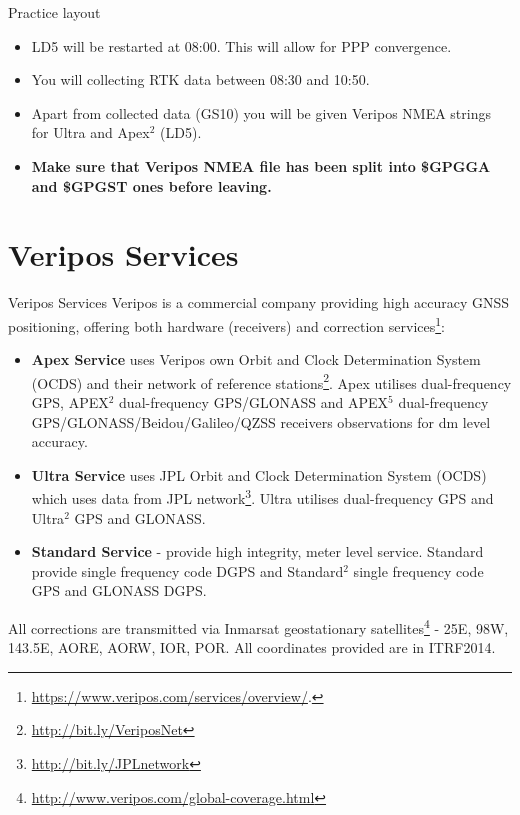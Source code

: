 \documentclass[11pt]{beamer}
\begin{document}
\begin{frame}{Practice layout}
	
	\begin{itemize}
		\item LD5 will be restarted at 08:00. This will allow for PPP convergence. 
		\item You will collecting RTK data between 08:30 and 10:50. 
		\item Apart from collected data (GS10) you will be given Veripos NMEA strings for Ultra and Apex$^2$ (LD5).
		\item \textbf{Make sure that Veripos NMEA file has been split into \$GPGGA and \$GPGST ones before leaving.}
	\end{itemize}

\end{frame}


\section{Veripos Services}

\begin{frame}[allowframebreaks]{Veripos Services}
	Veripos is a commercial company providing high accuracy GNSS positioning, offering both hardware (receivers) and correction services\footnote[frame]{\url{https://www.veripos.com/services/overview/}.}:
	
	\begin{itemize}
		\item \textbf{Apex Service} uses Veripos own Orbit and Clock Determination System (OCDS) and their network of reference stations\footnote{\url{http://bit.ly/VeriposNet}}. Apex utilises dual-frequency GPS, APEX$^2$ dual-frequency GPS/GLONASS and APEX$^5$  dual-frequency GPS/GLONASS/Beidou/Galileo/QZSS receivers observations for dm level accuracy.
		\item \textbf{Ultra Service} uses JPL Orbit and Clock Determination System (OCDS) which uses data from JPL network\footnote{\url{http://bit.ly/JPLnetwork}}. Ultra utilises dual-frequency GPS and Ultra$^2$ GPS and GLONASS.
		\item \textbf{Standard Service} - provide high integrity, meter level service. Standard provide single frequency code DGPS and Standard$^2$ single frequency code GPS and GLONASS DGPS.
	\end{itemize}
	All corrections are transmitted via Inmarsat geostationary satellites\footnote[frame]{\url{http://www.veripos.com/global-coverage.html}} - 25E, 98W, 143.5E, AORE, AORW, IOR, POR. All coordinates provided are in ITRF2014.

\end{frame}
\end{document}

